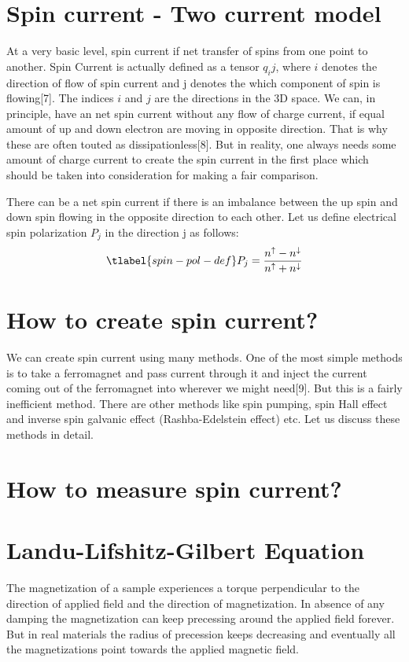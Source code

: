 \label{spintronics-and-quantum-materials}

\section{Spin current - Two current model}
At a very basic level, spin current if net transfer of spins from one point to another. 
Spin Current is actually defined as a tensor $q_ij$, where $i$ denotes the direction of 
flow of spin current and j denotes the which component of spin is flowing[7]. The indices 
$i$ and $j$ are the directions in the 3D space. We can, in principle, have an net spin current
without any flow of charge current, if equal amount of up and down electron are moving in 
opposite direction. That is why these are often touted as dissipationless[8]. But in reality, 
one always needs some amount of charge current to create the spin current in the first place 
which should be taken into consideration for making a fair comparison.

There can be a net spin current if there is an imbalance between the up spin and down spin 
flowing in the opposite direction to each other. Let us define electrical spin polarization 
$P_j$ in the direction j as follows:
\begin{equation}
    \centering
    \tlabel{spin-pol-def}
    P_j=\frac{n^{\uparrow}-n^{\downarrow}}{n^{\uparrow}+n^{\downarrow}}
\end{equation}



\section{How to create spin current?}

We can create spin current using many methods. One of the most simple methods is to take 
a ferromagnet and pass current through it and inject the current coming out of the 
ferromagnet into wherever we might need[9]. But this is a fairly inefficient method. 
There are other methods like spin pumping, spin Hall effect and inverse spin galvanic 
effect (Rashba-Edelstein effect) etc. Let us discuss these methods in detail.

\section{How to measure spin current?}


\section{Landu-Lifshitz-Gilbert Equation}
The magnetization of a sample experiences a torque perpendicular to the direction of 
applied field and the direction of magnetization. In absence of any damping the magnetization 
can keep precessing around the applied field forever. But in real materials the radius of 
precession keeps decreasing and eventually all the magnetizations point towards the applied 
magnetic field.  


